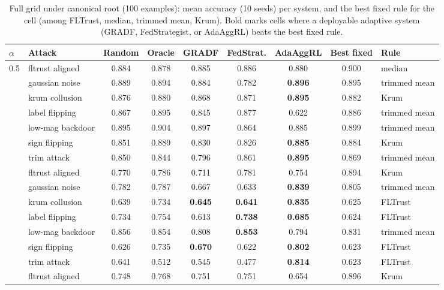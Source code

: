 \begin{table}[t]
\centering
\small
\caption{Full grid under canonical root (100 examples): mean accuracy (10 seeds) per system, and the best fixed rule for the cell (among FLTrust, median, trimmed mean, Krum). Bold marks cells where a deployable adaptive system (GRADF, FedStrategist, or AdaAggRL) beats the best fixed rule.}
\label{tab:full-grid-root100}
\begin{tabular}{llccccccl}
\toprule
$\alpha$ & Attack & Random & Oracle & GRADF & FedStrat. & AdaAggRL & Best fixed & Rule \\
\midrule
0.5 & fltrust aligned & 0.884 & 0.878 & 0.885 & 0.886 & 0.880 & 0.900 & median \\
 & gaussian noise & 0.889 & 0.894 & 0.884 & 0.782 & \textbf{0.896} & 0.895 & trimmed mean \\
 & krum collusion & 0.876 & 0.880 & 0.868 & 0.871 & \textbf{0.895} & 0.882 & Krum \\
 & label flipping & 0.867 & 0.895 & 0.845 & 0.877 & 0.622 & 0.886 & trimmed mean \\
 & low-mag backdoor & 0.895 & 0.904 & 0.897 & 0.864 & 0.885 & 0.899 & trimmed mean \\
 & sign flipping & 0.851 & 0.889 & 0.830 & 0.826 & \textbf{0.885} & 0.884 & Krum \\
 & trim attack & 0.850 & 0.844 & 0.796 & 0.861 & \textbf{0.895} & 0.869 & trimmed mean \\
\addlinespace
0.1 & fltrust aligned & 0.770 & 0.786 & 0.711 & 0.781 & 0.754 & 0.894 & Krum \\
 & gaussian noise & 0.782 & 0.787 & 0.667 & 0.633 & \textbf{0.839} & 0.805 & trimmed mean \\
 & krum collusion & 0.639 & 0.734 & \textbf{0.645} & \textbf{0.641} & \textbf{0.835} & 0.625 & FLTrust \\
 & label flipping & 0.734 & 0.754 & 0.613 & \textbf{0.738} & \textbf{0.685} & 0.624 & FLTrust \\
 & low-mag backdoor & 0.856 & 0.854 & 0.808 & \textbf{0.853} & 0.794 & 0.831 & trimmed mean \\
 & sign flipping & 0.626 & 0.735 & \textbf{0.670} & 0.622 & \textbf{0.802} & 0.623 & FLTrust \\
 & trim attack & 0.641 & 0.512 & 0.545 & 0.477 & \textbf{0.814} & 0.623 & FLTrust \\
\addlinespace
0.05 & fltrust aligned & 0.748 & 0.768 & 0.751 & 0.751 & 0.654 & 0.896 & Krum \\

\end{tabular}
\end{table}
